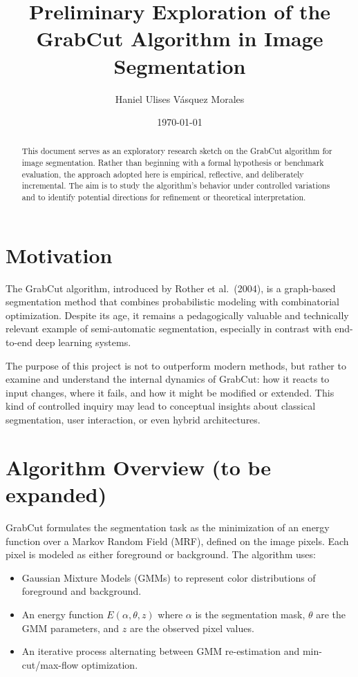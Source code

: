 \documentclass[11pt]{article}
\title{\textbf{Preliminary Exploration of the GrabCut Algorithm in Image Segmentation}}
\author{Haniel Ulises Vásquez Morales}
\date{\today}
\begin{document}
\maketitle

\begin{abstract}
This document serves as an exploratory research sketch on the GrabCut algorithm for image segmentation. Rather than beginning with a formal hypothesis or benchmark evaluation, the approach adopted here is empirical, reflective, and deliberately incremental. The aim is to study the algorithm’s behavior under controlled variations and to identify potential directions for refinement or theoretical interpretation.
\end{abstract}

\section{Motivation}

The GrabCut algorithm, introduced by Rother et al.~(2004), is a graph-based segmentation method that combines probabilistic modeling with combinatorial optimization. Despite its age, it remains a pedagogically valuable and technically relevant example of semi-automatic segmentation, especially in contrast with end-to-end deep learning systems.

The purpose of this project is not to outperform modern methods, but rather to examine and understand the internal dynamics of GrabCut: how it reacts to input changes, where it fails, and how it might be modified or extended. This kind of controlled inquiry may lead to conceptual insights about classical segmentation, user interaction, or even hybrid architectures.

\section{Algorithm Overview (to be expanded)}

GrabCut formulates the segmentation task as the minimization of an energy function over a Markov Random Field (MRF), defined on the image pixels. Each pixel is modeled as either foreground or background. The algorithm uses:

\begin{itemize}[itemsep=2pt]
    \item Gaussian Mixture Models (GMMs) to represent color distributions of foreground and background.
    \item An energy function $E(\alpha, \theta, z)$ where $\alpha$ is the segmentation mask, $\theta$ are the GMM parameters, and $z$ are the observed pixel values.
    \item An iterative process alternating between GMM re-estimation and min-cut/max-flow optimization.
\end{itemize}
\end{document}
